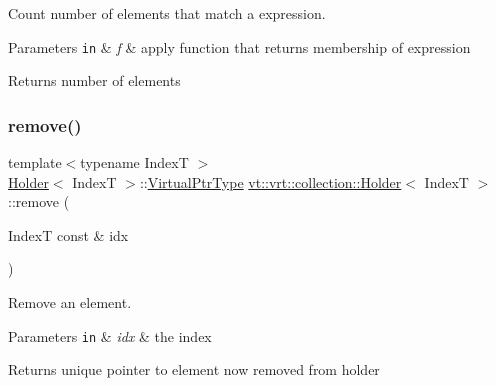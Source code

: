 Count number of elements that match a expression. 


\begin{DoxyParams}[1]{Parameters}
\mbox{\tt in}  & {\em f} & apply function that returns membership of expression\\
\hline
\end{DoxyParams}
\begin{DoxyReturn}{Returns}
number of elements 
\end{DoxyReturn}
\mbox{\label{structvt_1_1vrt_1_1collection_1_1_holder_a7920bc627a037fa9870dea0682dce31e}} 
\subsubsection{\texorpdfstring{remove()}{remove()}}
{\footnotesize\ttfamily template$<$typename IndexT $>$ \\
\hyperlink{structvt_1_1vrt_1_1collection_1_1_holder}{Holder}$<$ IndexT $>$\+::\hyperlink{structvt_1_1vrt_1_1collection_1_1_holder_a0a7eb9b25e205e5d113ec13964547a8e}{Virtual\+Ptr\+Type} \hyperlink{structvt_1_1vrt_1_1collection_1_1_holder}{vt\+::vrt\+::collection\+::\+Holder}$<$ IndexT $>$\+::remove (\begin{DoxyParamCaption}\item[{IndexT const \&}]{idx }\end{DoxyParamCaption})}



Remove an element. 


\begin{DoxyParams}[1]{Parameters}
\mbox{\tt in}  & {\em idx} & the index\\
\hline
\end{DoxyParams}
\begin{DoxyReturn}{Returns}
unique pointer to element now removed from holder 
\end{DoxyReturn}
\mbox{\label{structvt_1_1vrt_1_1collection_1_1_holder_a777a6cd6d587f484ba3787faa81f92a3}} 
